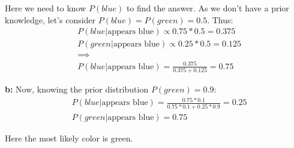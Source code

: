\documentclass[12pt, a4paper]{article}
\begin{document}
            Here we need to know $P(blue)$ to find the answer. As we don't have a prior knowledge, let's consider $P(blue) = P(green) = 0.5$. Thus:
            \begin{align*}
                &P(blue|\text{appears blue}) \propto 0.75 * 0.5 = 0.375\\
                &P(green|\text{appears blue}) \propto 0.25 * 0.5 = 0.125\\
                &\implies\\
                &P(blue|\text{appears blue}) = \frac{0.375}{0.375 + 0.125} = 0.75
            \end{align*}

            \textbf{b:}
            Now, knowing the prior distribution $P(green)=0.9$:
            \begin{align*}
                &P(blue|\text{appears blue}) = \frac{0.75 * 0.1}{0.75 * 0.1 + 0.25 * 0.9} = 0.25\\
                &P(green|\text{appears blue}) = 0.75
            \end{align*}

            Here the most likely color is green.
\end{document}
